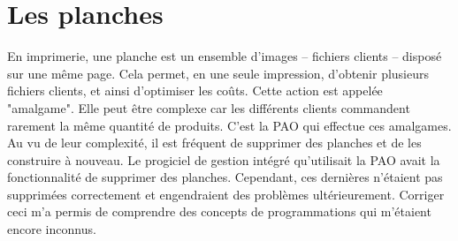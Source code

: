 \section{Les planches}
En imprimerie, une planche est un ensemble d'images -- fichiers clients -- disposé sur une même page. Cela permet, en une seule impression, d'obtenir plusieurs fichiers clients, et ainsi d'optimiser les coûts. Cette action est appelée "amalgame". Elle peut être complexe car les différents clients commandent rarement la même quantité de produits. C'est la PAO qui effectue ces amalgames. Au vu de leur complexité, il est fréquent de supprimer des planches et de les construire à nouveau.\newline
Le progiciel de gestion intégré qu'utilisait la PAO avait la fonctionnalité de supprimer des planches. Cependant, ces dernières n'étaient pas supprimées correctement et engendraient des problèmes ultérieurement. Corriger ceci m'a permis de comprendre des concepts de programmations qui m'étaient encore inconnus.